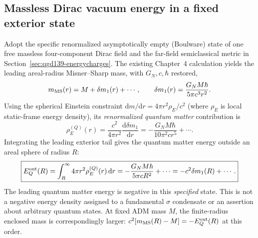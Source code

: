 \documentclass[11pt,a4paper]{article}
\newcommand{\dd}{\mathrm d}
\begin{document}
\subsection{Massless Dirac vacuum energy in a fixed exterior state}
Adopt the specific renormalized asymptotically empty (Boulware)
state of one free massless four-component Dirac field and the
far-field semiclassical metric in Section~\ref{sec:qgd139-energycharges}.
The existing Chapter~4 calculation yields the leading areal-radius
Misner--Sharp mass, with $G_N,c,\hbar$ restored,
\begin{equation}\label{eq:qgd140-mass}
 m_{\rm MS}(r)=M+\delta m_1(r)+\cdots,
 \qquad \delta m_1(r)=\frac{G_N M\hbar}{5\pi c^3r^2}.
\end{equation}
Using the spherical Einstein constraint
$\dd m/\dd r=4\pi r^2\rho_E/c^2$ (where $\rho_E$ is local
static-frame energy density), its \emph{renormalized quantum matter}
contribution is
\begin{equation}\label{eq:qgd140-rho}
 \boxed{\rho_E^{(Q)}(r)=\frac{c^2}{4\pi r^2}\frac{\dd\delta m_1}{\dd r}
 =-\frac{G_NM\hbar}{10\pi^2c r^5}+\cdots.}
\end{equation}
Integrating the leading exterior tail gives the quantum matter
energy outside an areal sphere of radius $R$:
\begin{equation}\label{eq:qgd140-Eout}
 \boxed{E_{Q}^{\rm out}(R)
 =\int_R^\infty4\pi r^2\rho_E^{(Q)}(r)\,\dd r
 =-\frac{G_NM\hbar}{5\pi cR^2}+\cdots
 =-c^2\delta m_1(R)+\cdots.}
\end{equation}
The leading quantum matter energy is negative in this \emph{specified}
state. This is not a negative energy density assigned to a fundamental
$\sigma$ condensate or an assertion about arbitrary quantum states. At
fixed ADM mass $M$, the finite-radius enclosed mass is correspondingly
larger: $c^2[m_{\rm MS}(R)-M]=-E_Q^{\rm out}(R)$ at this order.
\end{document}
